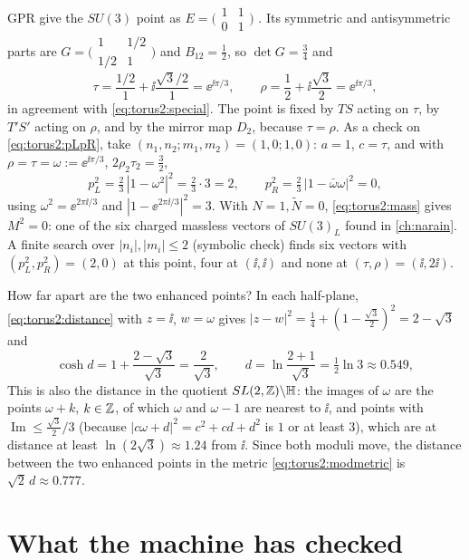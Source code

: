 \begin{example}\label{ex:torus2:enhanced}
GPR give the $SU(3)$ point as $E=\big(\begin{smallmatrix}1&1\\0&1\end{smallmatrix}\big)$
. Its symmetric and antisymmetric parts are
$G=\big(\begin{smallmatrix}1&1/2\\1/2&1\end{smallmatrix}\big)$ and $B_{12}=\frac12$, so
$\det G=\frac34$ and
\[
 \tau=\frac{1/2}{1}+\ii\frac{\sqrt{3}/2}{1}=\ee^{\ii\pi/3},\qquad
 \rho=\frac12+\ii\frac{\sqrt3}2=\ee^{\ii\pi/3},
\]
in agreement with \eqref{eq:torus2:special}. The point is fixed by $TS$ acting on $\tau$, by
$T'S'$ acting on $\rho$, and by the mirror map $D_2$, because $\tau=\rho$. As a check on
\eqref{eq:torus2:pLpR}, take $(n_1,n_2;m_1,m_2)=(1,0;1,0)$: $a=1$, $c=\tau$, and with
$\rho=\tau=\omega:=\ee^{\ii\pi/3}$, $2\rho_2\tau_2=\frac32$,
\[
 p_L^2=\tfrac23\,|1-\omega^2|^2=\tfrac23\cdot3=2,\qquad
 p_R^2=\tfrac23\,|1-\bar\omega\omega|^2=0 ,
\]
using $\omega^2=\ee^{2\pi\ii/3}$ and $|1-\ee^{2\pi\ii/3}|^2=3$. With $N=1,\tilde N=0$,
\eqref{eq:torus2:mass} gives $M^2=0$: one of the six charged massless vectors of $SU(3)_L$
found in \cref{ch:narain}. A finite search over $|n_i|,|m_i|\le2$ (symbolic check) finds
six vectors with $(p_L^2,p_R^2)=(2,0)$ at this point, four at $(\ii,\ii)$ and none at
$(\tau,\rho)=(\ii,2\ii)$.

How far apart are the two enhanced points? In each half-plane,
\eqref{eq:torus2:distance} with $z=\ii$, $w=\omega$ gives
$|z-w|^2=\frac14+(1-\frac{\sqrt3}2)^2=2-\sqrt3$ and
\[
 \cosh d=1+\frac{2-\sqrt3}{\sqrt3}=\frac2{\sqrt3},\qquad
 d=\ln\frac{2+1}{\sqrt3}=\tfrac12\ln3\approx0.549 ,
\]
This is also the distance in the quotient $SL(2,\mathbb{Z})\backslash\mathbb H$: the images of
$\omega$ are the points $\omega+k$, $k\in\mathbb{Z}$, of which $\omega$ and $\omega-1$ are nearest
to $\ii$, and points with $\operatorname{Im}\le\frac{\sqrt3}{2}/3$ (because
$|c\omega+d|^2=c^2+cd+d^2$ is $1$ or at least $3$), which are at distance at least
$\ln(2\sqrt3)\approx1.24$ from $\ii$. Since both moduli move, the distance between the two
enhanced points in the metric \eqref{eq:torus2:modmetric} is $\sqrt2\,d\approx0.777$.
\end{example}

\section{What the machine has checked}\label{sec:torus2:lean}

